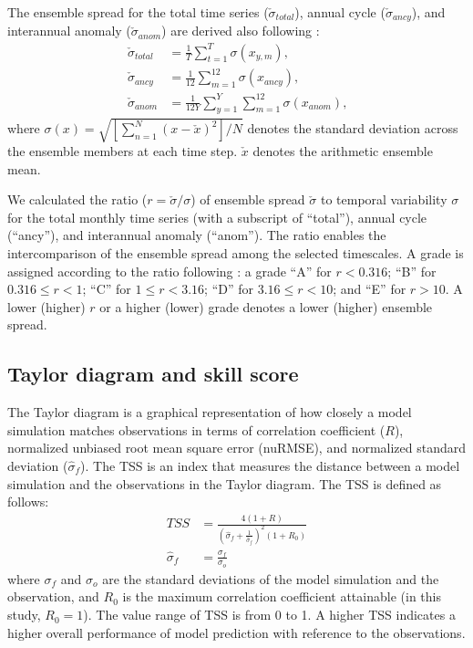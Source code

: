 \documentclass[essd, manuscript]{copernicus}
\begin{document}
The ensemble spread for the total time series (\(\check{\sigma}_{total}\)), annual cycle (\(\check{\sigma}_{ancy}\)), and interannual anomaly (\(\check{\sigma}_{anom}\)) are derived also following \citet{dirmeyer2006BAMS}:
\begin{align}
  \check{\sigma}_{total} & = \frac{1}{T} \sum_{t=1}^{T} \sigma(x_{y,m})
  \text{,} \\
  \check{\sigma}_{ancy}  & = \frac{1}{12} \sum_{m=1}^{12} \sigma(x_{ancy})
  \text{,} \\
  \check{\sigma}_{anom}  & = \frac{1}{12Y} \sum_{y=1}^{Y} \sum_{m=1}^{12} \sigma(x_{anom})
  \text{,}
\end{align}
where \(\sigma(x) = \sqrt{[\sum_{n=1}^{N}(x-\check{x})^2]/N}\) denotes the standard deviation across the ensemble members at each time step. \(\check{x}\) denotes the arithmetic ensemble mean.

We calculated the ratio (\(r=\check{\sigma}/\sigma\)) of ensemble spread \(\check{\sigma}\) to temporal variability \(\sigma\) for the total monthly time series (with a subscript of ``total''), annual cycle (``ancy''), and interannual anomaly (``anom''). The ratio enables the intercomparison of the ensemble spread among the selected timescales. A grade is assigned according to the ratio following \citet{dirmeyer2006BAMS}: a grade ``A'' for \(r < 0.316\); ``B'' for \(0.316 \le r < 1\); ``C'' for \(1 \le r < 3.16\); ``D'' for \(3.16 \le r < 10\); and ``E'' for \(r > 10\). A lower (higher) \(r\) or a higher (lower) grade denotes a lower (higher) ensemble spread.

\subsection{Taylor diagram and skill score}\label{sec:methods:taylor}

The Taylor diagram \citep{taylor2001JGRA} is a graphical representation of how closely a model simulation matches observations in terms of correlation coefficient (\(R\)), normalized unbiased root mean square error (nuRMSE), and normalized standard deviation (\(\hat{\sigma}_{f}\)). The TSS is an index that measures the distance between a model simulation and the observations in the Taylor diagram. The TSS is defined as follows:
\begin{align}
  TSS              & = \frac{4 (1 + R)}{(\hat{\sigma}_{f} + \frac{1}{\hat{\sigma}_{f}})^2 ( 1 + R_{0})} \\
  \hat{\sigma}_{f} & = \frac{\sigma_{f}}{\sigma_{o}}
\end{align}
where \(\sigma_{f}\) and \(\sigma_{o}\) are the standard deviations of the model simulation and the observation, and \(R_{0}\) is the maximum correlation coefficient attainable (in this study, \(R_{0} = 1\)). The value range of TSS is from 0 to 1. A higher TSS indicates a higher overall performance of model prediction with reference to the observations.
\end{document}
